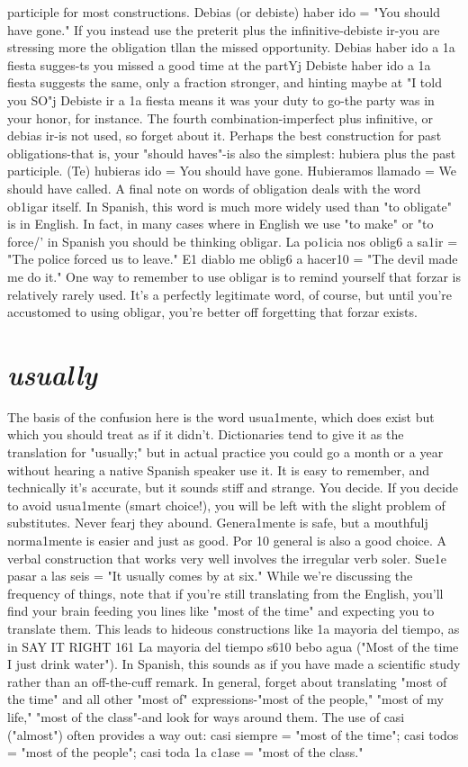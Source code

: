 {{{{participle for most constructions. Debias (or debiste) haber ido =
"You should have gone." If you instead use the preterit plus the infinitive-debiste ir-you are stressing more the obligation tllan the
missed opportunity. Debias haber ido a 1a fiesta sugges-ts you missed a
good time at the partYj Debiste haber ido a 1a fiesta suggests the same,
only a fraction stronger, and hinting maybe at "I told you SO"j Debiste
ir a 1a fiesta means it was your duty to go-the party was in your
honor, for instance. The fourth combination-imperfect plus infinitive, or debias ir-is not used, so forget about it. Perhaps the best construction for past obligations-that is, your "should haves"-is also
the simplest: hubiera plus the past participle. (Te) hubieras ido = You
should have gone. Hubieramos llamado = We should have called.
A final note on words of obligation deals with the word ob1igar itself. In Spanish, this word is much more widely used than "to
obligate" is in English. In fact, in many cases where in English we use
"to make" or "to force/' in Spanish you should be thinking obligar. La
po1icia nos oblig6 a sa1ir = "The police forced us to leave." E1 diablo
me oblig6 a hacer10 = "The devil made me do it." One way to remember to use obligar is to remind yourself that forzar is relatively rarely
used. It's a perfectly legitimate word, of course, but until you're accustomed to using obligar, you're better off forgetting that forzar exists.

\section{\emph{usually}}

The basis of the confusion here is the word usua1mente,
which does exist but which you should treat as if it didn't. Dictionaries tend to give it as the translation for "usually;" but in actual practice you could go a month or a year without hearing a native Spanish
speaker use it. It is easy to remember, and technically it's accurate, but
it sounds stiff and strange. You decide.
If you decide to avoid usua1mente (smart choice!), you will be
left with the slight problem of substitutes. Never fearj they abound.
Genera1mente is safe, but a mouthfulj norma1mente is easier and just
as good. Por 10 general is also a good choice. A verbal construction that
works very well involves the irregular verb soler. Sue1e pasar a las seis
= "It usually comes by at six."
While we're discussing the frequency of things, note that if
you're still translating from the English, you'll find your brain feeding
you lines like "most of the time" and expecting you to translate them.
This leads to hideous constructions like 1a mayoria del tiempo, as in
SAY IT RIGHT 161
La mayoria del tiempo s610 bebo agua ("Most of the time I just drink
water"). In Spanish, this sounds as if you have made a scientific study
rather than an off-the-cuff remark. In general, forget about translating
"most of the time" and all other "most of" expressions-"most of the
people," "most of my life," "most of the class"-and look for ways
around them. The use of casi ("almost") often provides a way out: casi
siempre = "most of the time"; casi todos = "most of the people";
casi toda 1a c1ase = "most of the class."

}}}}
